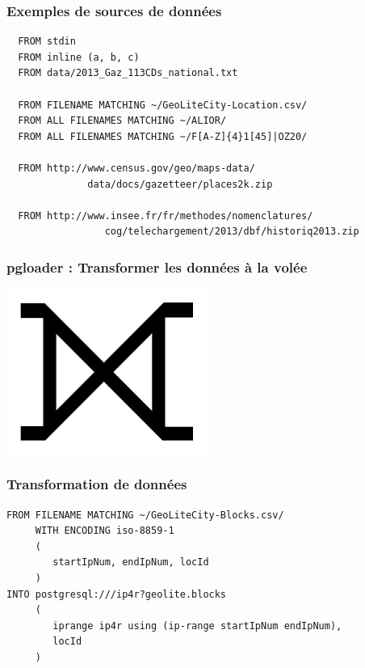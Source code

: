 \documentclass{beamer}
\begin{document}
\begin{frame}[fragile]
  \frametitle{Exemples de sources de données}

  \begin{verbatim}
  FROM stdin
  FROM inline (a, b, c)
  FROM data/2013_Gaz_113CDs_national.txt
  
  FROM FILENAME MATCHING ~/GeoLiteCity-Location.csv/
  FROM ALL FILENAMES MATCHING ~/ALIOR/
  FROM ALL FILENAMES MATCHING ~/F[A-Z]{4}1[45]|OZ20/
  
  FROM http://www.census.gov/geo/maps-data/
              data/docs/gazetteer/places2k.zip
  
  FROM http://www.insee.fr/fr/methodes/nomenclatures/
                 cog/telechargement/2013/dbf/historiq2013.zip
\end{verbatim}
\end{frame}

\begin{frame}
  \frametitle{pgloader : Transformer les données à la volée}


  \begin{center}
    \includegraphics[height=2.1in]{huge-full-outer-join.jpg}
  \end{center}
\end{frame}

\begin{frame}[fragile]
  \frametitle{Transformation de données}

  \begin{verbatim}
FROM FILENAME MATCHING ~/GeoLiteCity-Blocks.csv/
     WITH ENCODING iso-8859-1
     (
        startIpNum, endIpNum, locId
     )
INTO postgresql:///ip4r?geolite.blocks
     (
        iprange ip4r using (ip-range startIpNum endIpNum),
        locId
     )
  \end{verbatim}
\end{frame}
\end{document}
